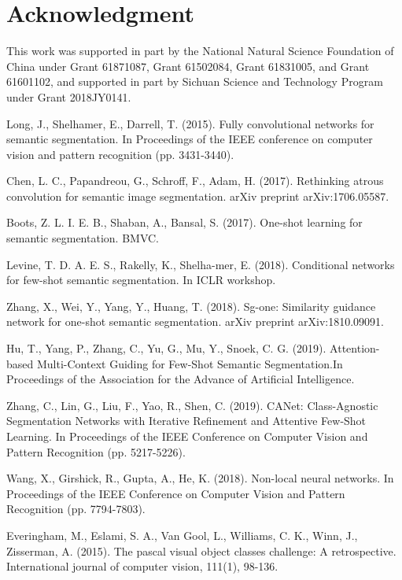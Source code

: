 \documentclass[runningheads]{llncs}
\begin{document}
\section*{Acknowledgment}
This work was supported in part by the National Natural Science Foundation of China under Grant 61871087, Grant 61502084, Grant 61831005, and Grant 61601102, and supported in part by Sichuan Science and Technology Program under Grant 2018JY0141.
\begin{thebibliography}{}
Long, J., Shelhamer, E., Darrell, T. (2015). Fully convolutional networks for semantic segmentation. In Proceedings of the IEEE conference on computer vision and pattern recognition (pp. 3431-3440).

Chen, L. C., Papandreou, G., Schroff, F., Adam, H. (2017). Rethinking atrous convolution for semantic image segmentation. arXiv preprint arXiv:1706.05587.

Boots, Z. L. I. E. B., Shaban, A., Bansal, S. (2017). One-shot learning for semantic segmentation. BMVC.

Levine, T. D. A. E. S., Rakelly, K., Shelha-mer, E. (2018). Conditional networks for few-shot semantic segmentation. In ICLR workshop.

Zhang, X., Wei, Y., Yang, Y., Huang, T. (2018). Sg-one: Similarity guidance network for one-shot semantic segmentation. arXiv preprint arXiv:1810.09091.

Hu, T., Yang, P., Zhang, C., Yu, G., Mu, Y., Snoek, C. G. (2019). Attention-based Multi-Context Guiding for Few-Shot Semantic Segmentation.In Proceedings of the Association for the Advance of Artificial Intelligence.

Zhang, C., Lin, G., Liu, F., Yao, R., Shen, C. (2019). CANet: Class-Agnostic Segmentation Networks with Iterative Refinement and Attentive Few-Shot Learning. In Proceedings of the IEEE Conference on Computer Vision and Pattern Recognition (pp. 5217-5226).

Wang, X., Girshick, R., Gupta, A., He, K. (2018). Non-local neural networks. In Proceedings of the IEEE Conference on Computer Vision and Pattern Recognition (pp. 7794-7803).

Everingham, M., Eslami, S. A., Van Gool, L., Williams, C. K., Winn, J., Zisserman, A. (2015). The pascal visual object classes challenge: A retrospective. International journal of computer vision, 111(1), 98-136.


\end{thebibliography}
\end{document}

